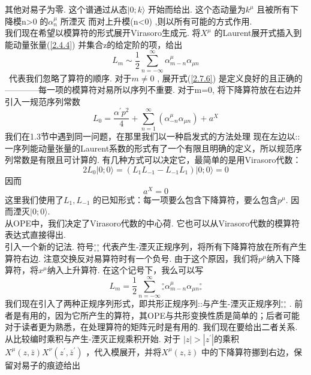 其他对易子为零. 这个谱通过从态$|0 ; k\rangle$ 开始而给出. 这个态动量为$k^\mu$ 且被所有下降模n>0 的$\alpha_n^\mu$ 所湮灭 而对上升模(n<0) ,则以所有可能的方式作用.\\
我们现在希望以模算符的形式展开Virasoro生成元. 将$X^\mu$ 的Laurent展开式插入到能动量张量(\ref{2.4.4}) 并集合z的给定阶的项，给出
\begin{equation}\label{2.7.6}
L_{m} \sim \frac{1}{2} \sum_{n=-\infty}^{\infty} \alpha_{m-n}^{\mu} \alpha_{\mu n}
\end{equation}
 ~代表我们忽略了算符的顺序. 对于$m\neq 0$ , 展开式(\ref{2.7.6}) 是定义良好的且正确的————每一项的模算符对易所以序列不重要. 对于m=0, 将下降算符放在右边并引入一规范序列常数
 \begin{equation}
 L_{0}=\frac{\alpha^{\prime} p^{2}}{4}+\sum_{n=1}^{\infty}\left(\alpha_{-n}^{\mu} \alpha_{\mu n}\right)+a^{X}
 \end{equation}
 我们在1.3节中遇到同一问题，在那里我们以一种启发式的方法处理 现在左边以::一序列能动量张量的Laurent系数的形式有了一个有限且明确的定义，所以规范序列常数是有限且可计算的. 有几种方式可以决定它，最简单的是用Virasoro代数：
 \begin{equation}\label{2.7.8}
 2 L_{0}|0 ; 0\rangle=\left(L_{1} L_{-1}-L_{-1} L_{1}\right)|0 ; 0\rangle=0
 \end{equation}
 因而
 \begin{equation}
 a^{X}=0
 \end{equation}
 这里我们使用了$L_1, L_{-1}$ 的已知形式：每一项要么包含下降算符，要么包含$p^\mu$. 因而湮灭$|0 ; 0\rangle$. \\
从OPE中，我们决定了Virasoro代数的中心荷. 它也可以从Virasoro代数的模算符表达式直接得出.\\
引入一个新的记法. 符号${}_\circ^\circ {}_\circ^\circ$ 代表产生-湮灭正规序列，将所有下降算符放在所有产生算符右边. 注意交换反对易算符时有一个负号. 由于这个原因，我们将$p^\mu$纳入下降算符，将$x^\mu$纳入上升算符. 在这个记号下，我么可以写
\begin{equation}\label{2.7.10}
L_{m}=\frac{1}{2} \sum_{n=-\infty}^{\infty}{}_{\circ}^{\circ} \alpha_{m-n}^{\mu} \alpha_{\mu n}{}_{\circ}^{\circ}
\end{equation}
我们现在引入了两种正规序列形式，即共形正规序列::与产生-湮灭正规序列${}_\circ^\circ {}_\circ^\circ$ . 前者是有用的，因为它所产生的算符，其OPE与共形变换性质是简单的；后者可能对于读者更为熟悉，在处理算符的矩阵元时是有用的. 我们现在要给出二者关系. 从比较编时乘积与产生-湮灭正规乘积开始. 对于 $|z|>\left|z^{\prime}\right|$的乘积$X^{\mu}(z, \bar{z}) X^{\nu}\left(z^{\prime}, \bar{z}^{\prime}\right)$ ，代入模展开，并将$X^{\mu}(z, \bar{z})$ 中的下降算符挪到右边，保留对易子的痕迹给出
